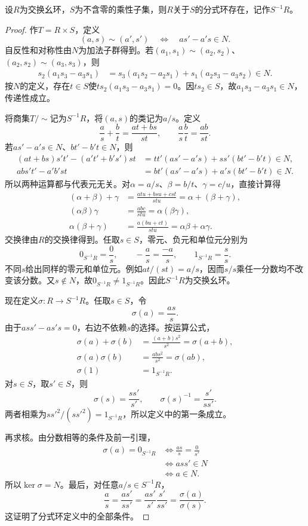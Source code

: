 \begin{theorem}\label{p2:localization-existence}
设$R$为交换幺环，$S$为不含零的乘性子集，则$R$关于$S$的分式环存在，记作$S^{-1}R$。
\end{theorem}
\begin{proof}
作$T=R\times S$，定义
\[
(a,s)\sim(a',s')\quad\Longleftrightarrow\quad as'-a's\in N.
\]
自反性和对称性由$N$为加法子群得到。若$(a_1,s_1)\sim(a_2,s_2)$、$(a_2,s_2)\sim(a_3,s_3)$，则
\begin{align*}
s_2(a_1s_3-a_3s_1)
&=s_3(a_1s_2-a_2s_1)+s_1(a_2s_3-a_3s_2)\in N.
\end{align*}
按$N$的定义，存在$t\in S$使$ts_2(a_1s_3-a_3s_1)=0$。因$ts_2\in S$，故$a_1s_3-a_3s_1\in N$，传递性成立。

将商集$T/{\sim}$记为$S^{-1}R$，将$(a,s)$的类记为$a/s$。定义
\[
\frac as+\frac bt=\frac{at+bs}{st},\qquad
\frac as\frac bt=\frac{ab}{st}.
\]
若$as'-a's\in N$、$bt'-b't\in N$，则
\begin{align*}
(at+bs)s't'-(a't'+b's')st
&=tt'(as'-a's)+ss'(bt'-b't)\in N,\\
abs't'-a'b'st
&=bt'(as'-a's)+a's(bt'-b't)\in N.
\end{align*}
所以两种运算都与代表元无关。对$\alpha=a/s$、$\beta=b/t$、$\gamma=c/u$，直接计算得
\begin{align*}
(\alpha+\beta)+\gamma&=\frac{atu+bsu+cst}{stu}=\alpha+(\beta+\gamma),\\
(\alpha\beta)\gamma&=\frac{abc}{stu}=\alpha(\beta\gamma),\\
\alpha(\beta+\gamma)&=\frac{a(bu+ct)}{stu}=\alpha\beta+\alpha\gamma.
\end{align*}
交换律由$R$的交换律得到。任取$s\in S$，零元、负元和单位元分别为
\[
0_{S^{-1}R}=\frac0s,\qquad -\frac as=\frac{-a}{s},\qquad
1_{S^{-1}R}=\frac ss.
\]
不同$s$给出同样的零元和单位元。例如$at/(st)=a/s$，因而$s/s$乘任一分数均不改变该分数。又$s\notin N$，故$0_{S^{-1}R}\ne1_{S^{-1}R}$。因此$S^{-1}R$为交换幺环。

现在定义$\sigma:R\to S^{-1}R$。任取$s\in S$，令
\[
\sigma(a)=\frac{as}{s}.
\]
由于$ass'-as's=0$，右边不依赖$s$的选择。按运算公式，
\begin{align*}
\sigma(a)+\sigma(b)&=\frac{(a+b)s^2}{s^2}=\sigma(a+b),\\
\sigma(a)\sigma(b)&=\frac{abs^2}{s^2}=\sigma(ab),\\
\sigma(1)&=1_{S^{-1}R}.
\end{align*}
对$s\in S$，取$s'\in S$，则
\[
\sigma(s)=\frac{ss'}{s'},\qquad
\sigma(s)^{-1}=\frac{s'}{ss'}.
\]
两者相乘为$ss'^2/(ss'^2)=1_{S^{-1}R}$，所以定义中的第一条成立。

再求核。由分数相等的条件及前一引理，
\begin{align*}
\sigma(a)=0_{S^{-1}R}
&\Longleftrightarrow \frac{as}{s}=\frac0{s'}\\
&\Longleftrightarrow ass'\in N\\
&\Longleftrightarrow a\in N.
\end{align*}
所以$\ker\sigma=N$。最后，对任意$a/s\in S^{-1}R$，
\[
\frac as=\frac{as'}{ss'}
=\frac{as'}{s'}\frac{s'}{ss'}
=\frac{\sigma(a)}{\sigma(s)}.
\]
这证明了分式环定义中的全部条件。
\end{proof}

